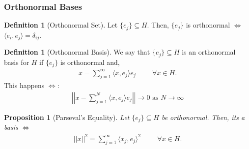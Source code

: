 \documentclass[psamsfonts]{amsart}
\newtheorem{prop}[thm]{Proposition}
\theoremstyle{definition}
\newtheorem{defn}[thm]{Definition}
\theoremstyle{remark}
\numberwithin{equation}{section}
\begin{document}
\subsubsection{Orthonormal Bases}

\begin{defn}[Orthonormal Set]
	Let \( \{ e_j \} \subseteq H \). Then, \( \{ e_j \} \) is orthonormal \( \iff \) \( \langle e_i, e_j \rangle = \delta_{ij} \).
\end{defn}

\begin{defn}[Orthonormal Basis]
	We say that \( \{ e_j \} \subseteq H \) is an orthonormal basis for \( H \) if \( \{ e_j \} \) is orthonormal and, 
	\begin{align*}
		x = \sum_{j=1}^\infty \langle x, e_j \rangle e_j \hspace{1cm} \forall x \in H.
	\end{align*}
	This happens \( \iff \):
	\begin{align*}
		\left| \left| x - \sum_{j=1}^N \langle x, e_j \rangle e_j \right| \right| \rightarrow 0 \text{ as } N \rightarrow \infty 
	\end{align*}
\end{defn}

\begin{prop}[Parseval's Equality]
	Let \( \{ e_j \} \subseteq H \) be orthonormal. Then, its a basis \( \iff \) 
	\begin{align}
		||x||^2 = \sum_{j=1}^\infty \langle x_j , e_j \rangle^2 \hspace{1cm} \forall x \in H.	
	\end{align}
\end{prop}
\end{document}
